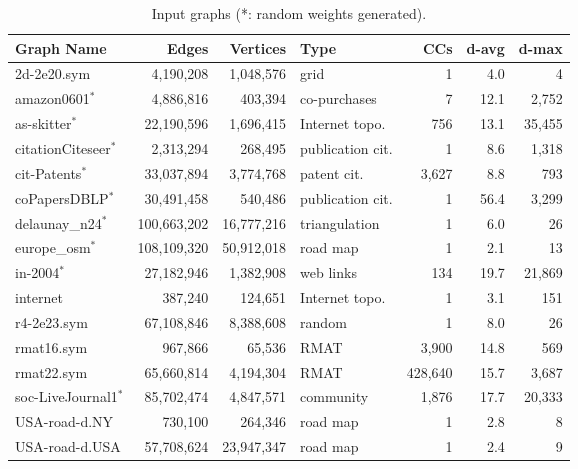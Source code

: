 \documentclass[11pt,a4paper]{article}
\begin{document}
\begin{table}[H]
  \centering
  \small
  \caption{Input graphs (*: random weights generated).}
  \label{tab:graphs}
  \begin{tabular}{lrrlrrr}
    \toprule
    \textbf{Graph Name} & \textbf{Edges} & \textbf{Vertices} & \textbf{Type} & \textbf{CCs} & \textbf{d-avg} & \textbf{d-max} \\
    \midrule
    2d-2e20.sym                  &   4,190,208 &  1,048,576 & grid             &       1 &  4.0 &      4 \\
    amazon0601$^\ast$         &   4,886,816 &    403,394 & co-purchases     &       7 & 12.1 &  2,752 \\
    as-skitter$^\ast$         &  22,190,596 &  1,696,415 & Internet topo.   &     756 & 13.1 & 35,455 \\
    citationCiteseer$^\ast$   &   2,313,294 &    268,495 & publication cit. &       1 &  8.6 &  1,318 \\
    cit-Patents$^\ast$        &  33,037,894 &  3,774,768 & patent cit.      &   3,627 &  8.8 &    793 \\
    coPapersDBLP$^\ast$       &  30,491,458 &    540,486 & publication cit. &       1 & 56.4 &  3,299 \\
    delaunay\_n24$^\ast$      & 100,663,202 & 16,777,216 & triangulation    &       1 &  6.0 &     26 \\
    europe\_osm$^\ast$        & 108,109,320 & 50,912,018 & road map         &       1 &  2.1 &     13 \\
    in-2004$^\ast$            &  27,182,946 &  1,382,908 & web links        &     134 & 19.7 & 21,869 \\
    internet                     &     387,240 &    124,651 & Internet topo.   &       1 &  3.1 &    151 \\
    r4-2e23.sym                  &  67,108,846 &  8,388,608 & random           &       1 &  8.0 &     26 \\
    rmat16.sym                   &     967,866 &     65,536 & RMAT             &   3,900 & 14.8 &    569 \\
    rmat22.sym                   &  65,660,814 &  4,194,304 & RMAT             & 428,640 & 15.7 &  3,687 \\
    soc-LiveJournal1$^\ast$   &  85,702,474 &  4,847,571 & community        &   1,876 & 17.7 & 20,333 \\
    USA-road-d.NY                &     730,100 &    264,346 & road map         &       1 &  2.8 &      8 \\
    USA-road-d.USA               &  57,708,624 & 23,947,347 & road map         &       1 &  2.4 &      9 \\
    \bottomrule
  \end{tabular}
\end{table}
\end{document}
